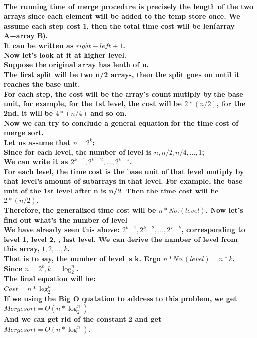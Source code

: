\documentclass{article}
\begin{document}
\paragraph{The running time of merge procedure is precisely the length of the two arrays since each element will be added to the temp store once. We assume each step cost 1, then the total time cost will be len(array A+array B).\\
It can be written as $right - left + 1$.\\
Now let's look at it at higher level.\\
Suppose the original array has lenth of n.\\
The first split will be two n/2 arrays, then the split goes on until it reaches the base unit.\\
For each step, the cost will be the array's count mutiply by the base unit, for example, for the 1st level, the cost will be $2*(n/2)$, for the 2nd, it will be $4*(n/4)$ and so on.\\
Now we can try to conclude a general equation for the time cost of merge sort.\\
Let us assume that $n = 2^k$;\\
Since for each level, the number of level is $n, n/2, n/4, \ldots ,1$;\\
We can write it as $2^{k-1},2^{k-2}, \ldots ,2^{k-k}$.\\
For each level, the time cost is the base unit of that level mutiply by that level's amount of subarrays in that level. For example, the base unit of the 1st level after n is n/2. Then the time cost will be $2 * (n/2)$.\\
Therefore, the generalized time cost will be $n * No.(level)$. Now let's find out what's the number of level. \\
We have already seen this above: $2^{k-1},2^{k-2}, \ldots ,2^{k-k}$, corresponding to level 1, level 2, \textellipsis, last level. We can derive the number of level from this array, $1,2, \ldots ,k$.\\
That is to say, the number of level is k. Ergo $n * No.(level) = n * k$.\\
Since $n = 2^k, k = \log_2^n$.\\
The final equation will be:\\
$Cost = n * \log_2^n$\\
If we using the Big O quatation to address to this problem, we get\\
$Mergesort = \Theta(n * \log_2^n)$\\
And we can get rid of the constant 2 and get\\
$Mergesort = O(n * \log^n)$.}
\end{document}

